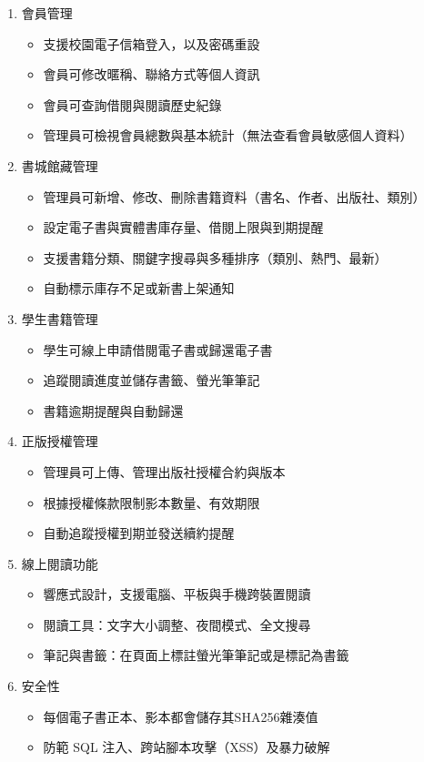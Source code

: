 \begin{enumerate}
    \item 會員管理
    \begin{itemize}
        \item 支援校園電子信箱登入，以及密碼重設
        \item 會員可修改暱稱、聯絡方式等個人資訊
        \item 會員可查詢借閱與閱讀歷史紀錄
        \item 管理員可檢視會員總數與基本統計（無法查看會員敏感個人資料）
    \end{itemize}

    \item 書城館藏管理
    \begin{itemize}
        \item 管理員可新增、修改、刪除書籍資料（書名、作者、出版社、類別）
        \item 設定電子書與實體書庫存量、借閱上限與到期提醒
        \item 支援書籍分類、關鍵字搜尋與多種排序（類別、熱門、最新）
        \item 自動標示庫存不足或新書上架通知
    \end{itemize}

    \item 學生書籍管理
    \begin{itemize}
        \item 學生可線上申請借閱電子書或歸還電子書
        \item 追蹤閱讀進度並儲存書籤、螢光筆筆記
        \item 書籍逾期提醒與自動歸還
    \end{itemize}

    \item 正版授權管理
    \begin{itemize}
        \item 管理員可上傳、管理出版社授權合約與版本
        \item 根據授權條款限制影本數量、有效期限
        \item 自動追蹤授權到期並發送續約提醒
    \end{itemize}

    \item 線上閱讀功能
    \begin{itemize}
        \item 響應式設計，支援電腦、平板與手機跨裝置閱讀
        \item 閱讀工具：文字大小調整、夜間模式、全文搜尋
        \item 筆記與書籤：在頁面上標註螢光筆筆記或是標記為書籤
    \end{itemize}

    \item 安全性
    \begin{itemize}
        \item 每個電子書正本、影本都會儲存其SHA256雜湊值
        \item 防範 SQL 注入、跨站腳本攻擊（XSS）及暴力破解
    \end{itemize}
\end{enumerate}

